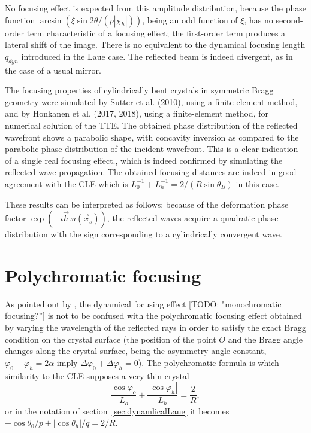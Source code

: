 \documentclass[preprint]{iucr}              %
\newcommand{\todo}[1]{{\color{red}[TODO: "#1'']}}
\newcommand{\inred}[1]{{\color{red}#1}}
\begin{document}
No focusing effect is expected from this amplitude distribution, because the phase function $\arcsin(\xi \sin2\theta/ (p |\chi_h|))$, being an odd function of $\xi$, has no second-order term characteristic of a focusing effect; the first-order term produces a lateral shift of the image. There is no equivalent to the dynamical focusing length $q_{dyn}$ introduced in the Laue case. The reflected beam is indeed divergent, as in the case of a usual mirror.

The focusing properties of cylindrically bent crystals in symmetric Bragg geometry were simulated by Sutter et al. (2010), using a finite-element method, and by Honkanen et al. (2017, 2018), using a finite-element method, for numerical solution of the TTE. The obtained phase distribution of the reflected wavefront shows a parabolic shape, with concavity inversion as compared to the parabolic phase distribution of the incident wavefront. This is a clear indication of a single real focusing effect., which is indeed confirmed by simulating the reflected wave propagation. The obtained focusing distances are indeed in good agreement with the CLE which is $L_0^{-1}+L_h^{-1}=2/(R \sin\theta_B)$ in this case.

These results can be interpreted as follows: because of the deformation phase factor $\exp(-i\vec h. u(\vec x_s))$, the reflected waves acquire a quadratic phase distribution with the sign corresponding to a cylindrically convergent wave.



\section{Polychromatic focusing}
\label{sec:polychromatic}

As pointed out by \cite{CK}, the dynamical focusing effect \todo{monochromatic focusing?} is not to be confused with the polychromatic focusing effect \cite{handbook} obtained by varying the wavelength of the reflected rays in order to satisfy the exact Bragg condition on the crystal surface (the position of the point $O$ and the Bragg angle changes along the crystal surface, being the asymmetry angle constant, $\varphi_0+\varphi_h=2\alpha$ imply $\Delta\varphi_0+\Delta\varphi_h=0$). 
The polychromatic formula is \inred{which similarity to the CLE supposes a very thin crystal}
\begin{equation}
\label{eq:polychromaticfocusing}
\frac{{\cos {\varphi _o}}}{{{L_o}}} + \frac{{\left| {\cos {\varphi _h}} \right|}}{{{L_h}}} = \frac{2}{R},
\end{equation}
or in the notation of section~\ref{sec:dynamlicalLaue} it becomes $-\cos\theta_0/p + |\cos\theta_h|/q=2/R$. 
\end{document}
